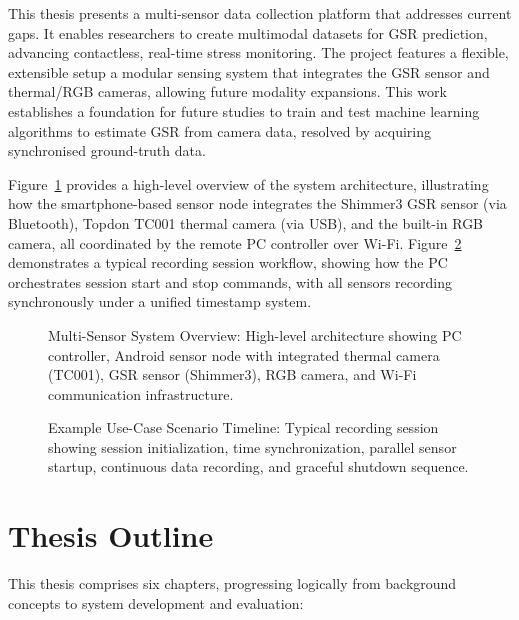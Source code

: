 This thesis presents a multi-sensor data collection platform that addresses current gaps. It enables researchers to create multimodal datasets for GSR prediction, advancing contactless, real-time stress monitoring. The project features a flexible, extensible setup \textemdash a modular sensing system \textemdash that integrates the GSR sensor and thermal/RGB cameras, allowing future modality expansions. This work establishes a foundation for future studies to train and test machine learning algorithms to estimate GSR from camera data, resolved by acquiring synchronised ground-truth data.

Figure~\ref{fig:multisensor-overview} provides a high-level overview of the system architecture, illustrating how the smartphone-based sensor node integrates the Shimmer3 GSR sensor (via Bluetooth), Topdon TC001 thermal camera (via USB), and the built-in RGB camera, all coordinated by the remote PC controller over Wi-Fi. Figure~\ref{fig:usecase-timeline} demonstrates a typical recording session workflow, showing how the PC orchestrates session start and stop commands, with all sensors recording synchronously under a unified timestamp system.

\begin{figure}[htbp]
    \centering
    \caption{Multi-Sensor System Overview: High-level architecture showing PC controller, Android sensor node with integrated thermal camera (TC001), GSR sensor (Shimmer3), RGB camera, and Wi-Fi communication infrastructure.}
    \label{fig:multisensor-overview}
\end{figure}

\begin{figure}[htbp]
    \centering
    \caption{Example Use-Case Scenario Timeline: Typical recording session showing session initialization, time synchronization, parallel sensor startup, continuous data recording, and graceful shutdown sequence.}
    \label{fig:usecase-timeline}
\end{figure}

\section{Thesis Outline}
This thesis comprises six chapters, progressing logically from background concepts to system development and evaluation:

